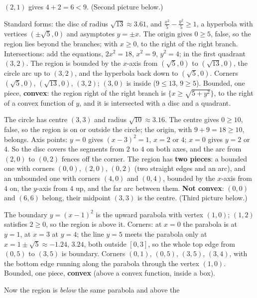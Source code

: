 \begin{solutions}
        $(2,1)$ gives $4+2=6<9$. (Second picture below.)
  \item Standard forms: the disc of radius $\sqrt{13}\approx3.61$, and
        $\tfrac{x^{2}}{5}-\tfrac{y^{2}}{5}\ge1$, a hyperbola with vertices
        $(\pm\sqrt5,0)$ and asymptotes $y=\pm x$. The origin gives
        $0\ge5$, false, so the region lies beyond the branches; with
        $x\ge0$, to the right of the right branch. Intersections: add the
        equations, $2x^{2}=18$, $x^{2}=9$, $y^{2}=4$; in the first quadrant
        $(3,2)$. The region is bounded by the $x$-axis from $(\sqrt5,0)$ to
        $(\sqrt{13},0)$, the circle arc up to $(3,2)$, and the hyperbola
        back down to $(\sqrt5,0)$. Corners $(\sqrt5,0)$, $(\sqrt{13},0)$,
        $(3,2)$; $(3,0)$ is inside ($9\le13$, $9\ge5$). Bounded, one
        piece, \textbf{convex}: the region right of the right branch is
        $\{x\ge\sqrt{5+y^{2}}\}$, to the right of a convex function of
        $y$, and it is intersected with a disc and a quadrant.
  \item The circle has centre $(3,3)$ and radius $\sqrt{10}\approx3.16$.
        The centre gives $0\ge10$, false, so the region is on or outside
        the circle; the origin, with $9+9=18\ge10$, belongs. Axis points:
        $y=0$ gives $(x-3)^{2}=1$, $x=2$ or $4$; $x=0$ gives $y=2$ or $4$.
        So the disc covers the segments from $2$ to $4$ on both axes, and
        the arc from $(2,0)$ to $(0,2)$ fences off the corner. The region
        has \textbf{two pieces}: a bounded one with corners $(0,0)$,
        $(2,0)$, $(0,2)$ (two straight edges and an arc), and an unbounded
        one with corners $(4,0)$ and $(0,4)$, bounded by the $x$-axis from
        $4$ on, the $y$-axis from $4$ up, and the far arc between them.
        \textbf{Not convex}: $(0,0)$ and $(6,6)$ belong, their midpoint
        $(3,3)$ is the centre. (Third picture below.)
  \item The boundary $y=(x-1)^{2}$ is the upward parabola with vertex
        $(1,0)$; $(1,2)$ satisfies $2\ge0$, so the region is above it.
        Corners: at $x=0$ the parabola is at $y=1$, at $x=3$ at $y=4$; the
        line $y=5$ meets the parabola only at $x=1\pm\sqrt5\approx-1.24$,
        $3.24$, both outside $[0,3]$, so the whole top edge from $(0,5)$
        to $(3,5)$ is boundary. Corners $(0,1)$, $(0,5)$, $(3,5)$, $(3,4)$,
        with the bottom edge running along the parabola through the
        vertex $(1,0)$. Bounded, one piece, \textbf{convex} (above a convex
        function, inside a box).
  \item Now the region is \emph{below} the same parabola and above the

\end{solutions}
